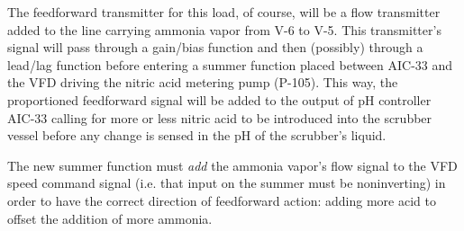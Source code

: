 
The feedforward transmitter for this load, of course, will be a flow transmitter added to the line carrying ammonia vapor from V-6 to V-5.  This transmitter's signal will pass through a gain/bias function and then (possibly) through a lead/lag function before entering a summer function placed between AIC-33 and the VFD driving the nitric acid metering pump (P-105).  This way, the proportioned feedforward signal will be added to the output of pH controller AIC-33 calling for more or less nitric acid to be introduced into the scrubber vessel before any change is sensed in the pH of the scrubber's liquid.
 
\vskip 10pt

The new summer function must {\it add} the ammonia vapor's flow signal to the VFD speed command signal (i.e. that input on the summer must be noninverting) in order to have the correct direction of feedforward action: adding more acid to offset the addition of more ammonia.





